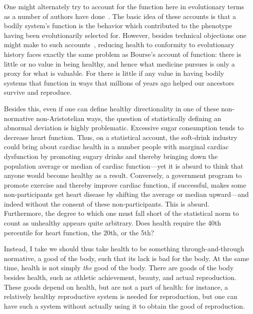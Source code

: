 One might alternately try to account for the function here in evolutionary terms as a number of authors
have done~\parencite{Wright1973,Millikan1984,Neander1991,Neander1995,Agar1993,Sterelny1990,Papineau1993,Dretske1995}.
The basic idea of these accounts is that a bodily system's function is the behavior which contributed to the 
phenotype having been evolutionarily selected for. However, besides technical objections one might make to such
accounts~, reducing health to conformity to evolutionary history
faces exactly the same problem as Bourse's account of function: there is little or no value in being healthy,
and hence what medicine pursues is only a proxy for what is valuable. For there is little if any value in having
bodily systems that function in ways that millions of years ago helped our ancestors survive and reproduce. 

Besides this, even if one can define healthy directionality in one of these non-normative non-Aristotelian ways, 
the question of statistically defining an abnormal deviation is highly problematic. Excessive sugar consumption 
tends to decrease heart function. Thus, on a statistical account, the soft-drink industry could bring about 
cardiac health in a number people with marginal cardiac dysfunction by promoting sugary drinks and thereby 
bringing down the population average or median of cardiac function---yet it is absurd to think that anyone
would become healthy as a result. Conversely, a government program to promote
exercise and thereby improve cardiac function, if successful, makes some non-participants get heart disease 
by shifting the average or median upward---and indeed without the consent of these non-participants.
This is absurd. Furthermore, the degree to which one must fall short of the statistical norm to count
as unhealthy appears quite arbitrary. Does health require the 40th percentile for heart function, the 20th, or 
the 5th? 

Instead, I take we should thus take health to be something through-and-through normative, a good of the body,
such that its lack is bad for the body.
At the same time, health is not simply \textit{the} good of the body. There are goods of the body besides health, such 
as athletic achievement, beauty, and actual reproduction. These goods depend on health, but are not a part of health: 
for instance, a relatively healthy reproductive system is needed for reproduction, but one can have such a system 
without actually using it to obtain the good of reproduction.

